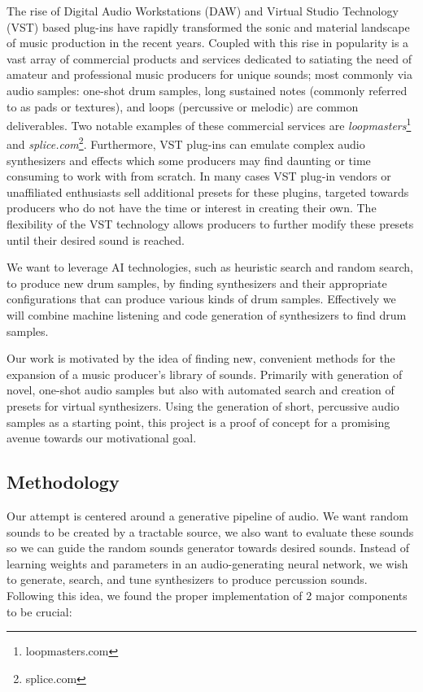 \documentclass{nime-alternate} %
\begin{document}
The rise of Digital Audio Workstations (DAW) \cite{leider2004digital} and Virtual Studio Technology (VST) based plug-ins \cite{tanev2013virtual} have rapidly transformed the sonic and material landscape of music production in the recent years. Coupled with this rise in popularity is a vast array of commercial products and services dedicated to satiating the need of amateur and professional music producers for unique sounds; most commonly via audio samples: one-shot drum samples, long sustained notes (commonly referred to as pads or textures), and loops (percussive or melodic) are common deliverables. Two notable examples of these commercial services are \textit{loopmasters}\footnote{loopmasters.com} and \textit{splice.com}\footnote{splice.com}. Furthermore, VST plug-ins can emulate complex audio synthesizers and effects which some producers may find daunting or time consuming to work with from scratch. In many cases VST plug-in vendors or unaffiliated enthusiasts sell additional presets for these plugins, targeted towards producers who do not have the time or interest in creating their own. The flexibility of the VST technology allows producers to further modify these presets until their desired sound is reached.

We want to leverage AI technologies, such as heuristic search and random search, to produce new drum samples, by finding synthesizers and their appropriate configurations that can produce various kinds of drum samples. Effectively we will combine machine listening and code generation of synthesizers to find drum samples.

Our work is motivated by the idea of finding new, convenient methods for the expansion of a music producer's library of sounds. Primarily with generation of novel, one-shot audio samples but also with automated search and creation of presets for virtual synthesizers. Using the generation of short, percussive audio samples as a starting point, this project is a proof of concept for a promising avenue towards our motivational goal.

\subsection{Methodology}
Our attempt is centered around a generative pipeline of audio. We want random sounds to be created by a tractable source, we also want to evaluate these sounds so we can guide the random sounds generator towards desired sounds. Instead of learning weights and parameters in an audio-generating neural network, we wish to generate, search, and tune synthesizers to produce percussion sounds. Following this idea, we found the proper implementation of 2 major components to be crucial:
\end{document}
